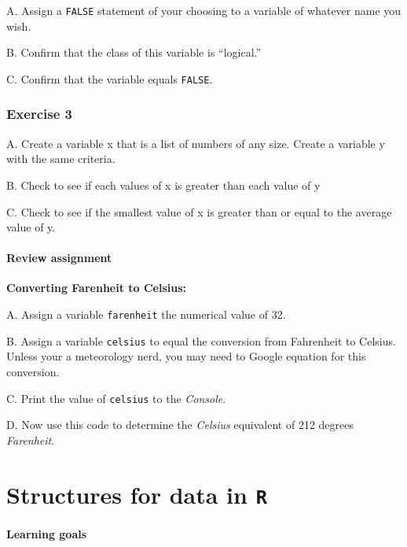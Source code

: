 \documentclass[
]{book}
\begin{document}
A. Assign a \texttt{FALSE} statement of your choosing to a variable of whatever name you wish.

B. Confirm that the class of this variable is ``logical.''

C. Confirm that the variable equals \texttt{FALSE}.

\hypertarget{exercise-3-1}{%
\subsection*{Exercise 3}\label{exercise-3-1}}

A. Create a variable x that is a list of numbers of any size. Create a variable y with the same criteria.

B. Check to see if each values of x is greater than each value of y

C. Check to see if the smallest value of x is greater than or equal to the average value of y.

\hypertarget{review-assignment-2}{%
\subsubsection*{Review assignment}\label{review-assignment-2}}

\textbf{Converting Farenheit to Celsius:}

A. Assign a variable \texttt{farenheit} the numerical value of 32.

B. Assign a variable \texttt{celsius} to equal the conversion from Fahrenheit to Celsius. Unless your a meteorology nerd, you may need to Google equation for this conversion.

C. Print the value of \texttt{celsius} to the \emph{Console}.

D. Now use this code to determine the \emph{Celsius} equivalent of 212 degrees \emph{Farenheit}.

\hypertarget{structures-for-data-in-r}{%
\chapter{\texorpdfstring{Structures for data in \texttt{R}}{Structures for data in R}}\label{structures-for-data-in-r}}

\hypertarget{learning-goals-3}{%
\subsubsection*{Learning goals}\label{learning-goals-3}}
\end{document}
